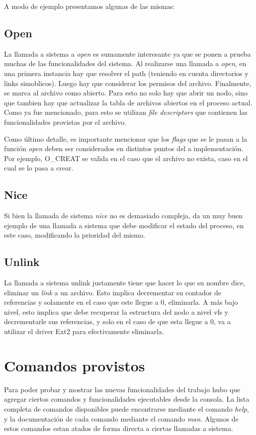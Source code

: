 \documentclass[a4paper,10pt]{article}
\begin{document}
A modo de ejemplo presentamos algunas de las mismas:

\subsection{Open}

La llamada a sistema a \textit{open} es sumamente interesante ya que se ponen a prueba muchas de las funcionalidades del
sistema. Al realizarse una llamada a \textit{open}, en una primera instancia hay que resolver el path (teniendo en cuenta
directorios y links simoblicos). Luego hay que considerar los permisos del archivo. Finalmente, se marca al archivo como
abierto. Para esto no solo hay que abrir un nodo, sino que tambien hay que actualizar la tabla de archivos abiertos en
el proceso actual. Como ya fue mencionado, para esto se utilizan \textit{file descriptors} que contienen las
funcionalidades provistas por el archivo.

Como último detalle, es importante mencionar que los \textit{flags} que se le pasan a la función \textit{open} deben
ser considerados en distintos puntos del a implementación. Por ejemplo, O\_CREAT se valida en el caso que el archivo
no exista, caso en el cual se lo pasa a crear.

\subsection{Nice}

Si bien la llamada de sistema \textit{nice} no es demasiado compleja, da un muy buen ejemplo de una llamada a sistema
que debe modificar el estado del proceso, en este caso, modificando la prioridad del mismo.

\subsection{Unlink}

La llamada a sistema unlink justamente tiene que hacer lo que su nombre dice, eliminar un \textit{link} a un archivo.
Esto implica decrementar su contador de referencias y solamente en el caso que este llegue a 0, eliminarla. A más bajo
nivel, esto implica que debe recuperar la estructura del nodo a nivel vfs y decrementarle sus referencias, y solo en el
caso de que esta llegue a 0, va a utilizar el driver Ext2 para efectivamente eliminarla. 

\newpage
\section{Comandos provistos}
Para poder probar y mostrar las nuevas funcionalidades del trabajo hubo que agregar ciertos comandos y funcionalidades ejecutables desde la consola. 
La lista completa de comandos disponibles puede encontrarse mediante el comando \textit{help}, y la documentación de cada comando mediante el comando \textit{man}.
Algunos de estos comandos estan atados de forma directa a ciertas llamadas a sistema.
\end{document}
